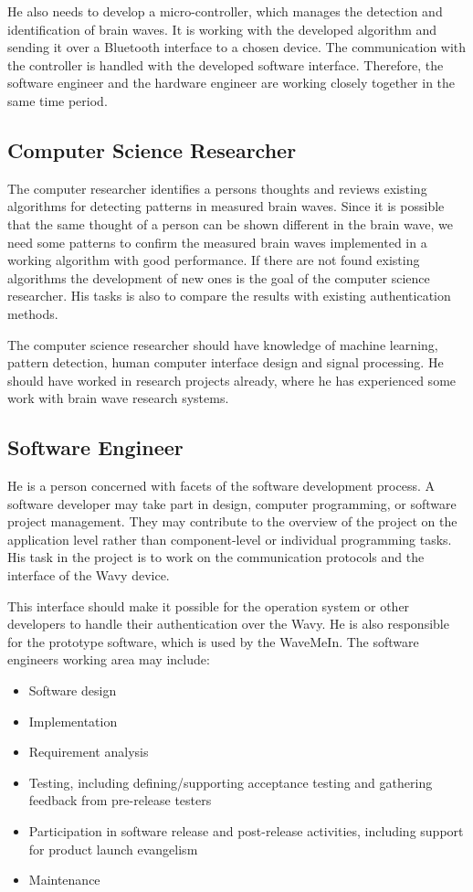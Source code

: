 He also needs to develop a micro-controller, which manages the detection and identification of brain waves. It is working with the developed algorithm and sending it over a Bluetooth interface to a chosen device. The communication with the controller is handled with the developed software interface. Therefore, the software engineer and the hardware engineer are working closely together in the same time period.

\subsection{Computer Science Researcher}
The computer researcher identifies a persons thoughts and reviews existing algorithms for detecting patterns in measured brain waves. Since it is possible that the same thought of a person can be shown different in the brain wave, we need some patterns to confirm the measured brain waves implemented in a working algorithm with good performance. If there are not found existing algorithms the development of new ones is the goal of the computer science researcher. His tasks is also to compare the results with existing authentication methods.

The computer science researcher should have knowledge of machine learning, pattern detection, human computer interface design and signal processing. He should have worked in research projects already, where he has experienced some work with brain wave research systems.

\subsection{Software Engineer}
He is a person concerned with facets of the software development process. A software  developer may take part in design, computer programming, or software project management. They may contribute to the overview of the project on the application level rather than  component-level or individual programming tasks.  His task in the project is to work on the communication protocols and the interface of the Wavy device.

This interface should make it possible for the operation system or other developers to handle their authentication over the Wavy. He is also responsible for the prototype software, which is used by the WaveMeIn.
The software engineers working area may include:
\begin{itemize}
\item Software design
\item Implementation
\item Requirement analysis
\item {Testing, including defining/supporting acceptance testing and gathering feedback from pre-release testers}
\item {Participation in software release and post-release activities, including support for product launch evangelism}
\item {Maintenance}
\end{itemize}


